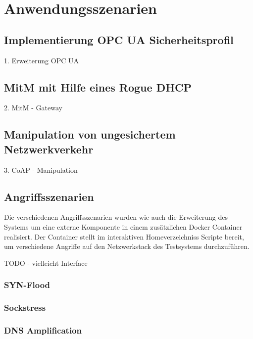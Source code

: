 \chapter{Anwendungsszenarien}
\label{Anwendungsszenarien}

\section{Implementierung OPC UA Sicherheitsprofil}
1. Erweiterung OPC UA

\section{MitM mit Hilfe eines Rogue DHCP}
2. MitM - Gateway


\section{Manipulation von ungesichertem Netzwerkverkehr}
3. CoAP - Manipulation

\section{Angriffsszenarien}
Die verschiedenen Angriffsszenarien wurden wie auch die Erweiterung des Systems um eine externe Komponente in einem zusätzlichen Docker Container realisiert. Der Container stellt im interaktiven Homeverzeichniss Scripte bereit, um verschiedene Angriffe auf den Netzwerkstack des Testsystems durchzuführen.

TODO - vielleicht Interface

\subsection{SYN-Flood}
\subsection{Sockstress}
\subsection{\ac{DNS} Amplification}